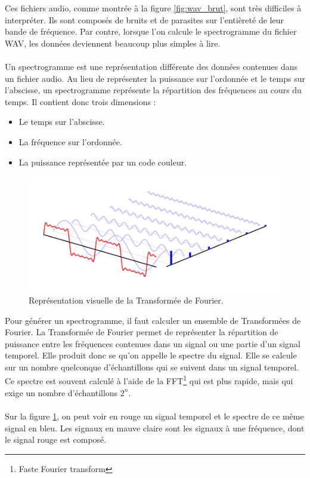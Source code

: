 \documentclass[11pt]{article}
\begin{document}
Ces fichiers audio, comme montrée à la figure \ref{fig:wav_brut}, sont très difficiles à interpréter.
Ils sont composés de bruits et de parasites sur l'entièreté de leur bande de fréquence.
Par contre, lorsque l'on calcule le spectrogramme du fichier WAV, les données deviennent beaucoup plus simples à lire.
\\
\\
Un spectrogramme est une représentation différente des données contenues dans un fichier audio.
Au lieu de représenter la puissance sur l'ordonnée et le temps sur l'abscisse, un spectrogramme représente la répartition des fréquences au cours du temps.
Il contient donc trois dimensions :
\begin{itemize}
    \item Le temps sur l'abscisse.
    \item La fréquence sur l'ordonnée.
    \item La puissance représentée par un code couleur.\\
\end{itemize}

\begin{figure}[h]
    \begin{center}
        \includegraphics[scale=0.7]{spectre.png}
        \caption{Représentation visuelle de la Transformée de Fourier.}
        \label{fig:expl_fourier}
    \end{center}
\end{figure}

Pour générer un spectrogramme, il faut calculer un ensemble de Transformées de Fourier.
La Transformée de Fourier permet de représenter la répartition de puissance entre les fréquences contenues dans un signal ou une partie d'un signal temporel.
Elle produit donc se qu'on appelle le spectre du signal.
Elle se calcule sur un nombre quelconque d'échantillons qui se suivent dans un signal temporel.
Ce spectre est souvent calculé à l'aide de la FFT\footnote{Faste Fourier transform} qui est plus rapide, mais qui exige un nombre d'échantillons $2^{n}$.\\
\\
Sur la figure \ref{fig:expl_fourier}, on peut voir en rouge un signal temporel et le spectre de ce même signal en bleu.
Les signaux en mauve claire sont les signaux à une fréquence, dont le signal rouge est composé.
\end{document}
